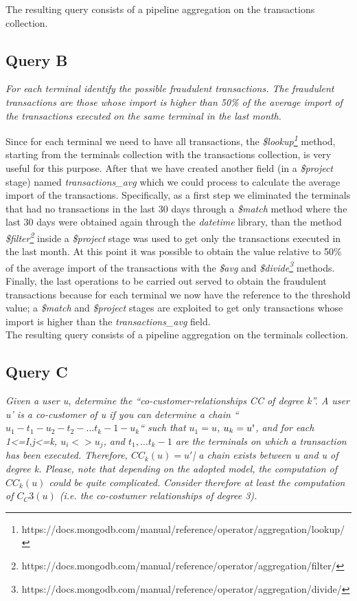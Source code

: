 \documentclass[runningheads]{llncs}
\begin{document}
The resulting query consists of a pipeline aggregation on the transactions collection.

\subsection{Query B}

\emph{For each terminal identify the possible fraudulent transactions. The fraudulent transactions
are those whose import is higher than 50\% of the average import of the transactions
executed on the same terminal in the last month.}

\hfill

Since for each terminal we need to have all transactions, the \emph{\$lookup\footnote{https://docs.mongodb.com/manual/reference/operator/aggregation/lookup/}} method, starting from the terminals collection with the transactions collection, is very useful for this purpose. After that we have created another field (in a \emph{\$project} stage) named \emph{transactions\_avg} which we could process to calculate the average import of the transactions. Specifically, as a first step we eliminated the terminals that had no transactions in the last 30 days through a \emph{\$match} method where the last 30 days were obtained again through the \emph{datetime} library, than the method \emph{\$filter\footnote{https://docs.mongodb.com/manual/reference/operator/aggregation/filter/}} inside a \emph{\$project} stage was used to get only the transactions executed in the last month. At this point it was possible to obtain the value relative to 50\% of the average import of the transactions with the \emph{\$avg} and \emph{\$divide\footnote{https://docs.mongodb.com/manual/reference/operator/aggregation/divide/}} methods.\\
Finally, the last operations to be carried out served to obtain the fraudulent transactions because for each terminal we now have the reference to the threshold value; a \emph{\$match} and \emph{\$project} stages are exploited to get only transactions whose import is higher than the \emph{transactions\_avg} field.\\

The resulting query consists of a pipeline aggregation on the terminals collection.


\subsection{Query C}
\emph{Given a user u, determine the “co-customer-relationships CC of degree k”. A user u’ is a co-customer of u if you can determine a chain “$u_1-t_1-u_2-t_2- \ldots t_k-1-u_k$“ such that $u_1=u$, $u_k=u\textnormal{\textquotesingle}$, and for each 1<=I,j<=k, $u_i <> u_j$, and $t_1, \ldots t_k-1$ are the terminals on which a transaction has been executed. Therefore, $CC_k(u)={u'}$| a chain exists between u and u\textnormal{\textquotesingle} of degree k. Please, note that depending on the adopted model, the computation of $CC_k(u)$ could be quite complicated. Consider therefore at least the computation of $C_C3(u)$ (i.e. the co-costumer relationships of degree 3).}
\end{document}
